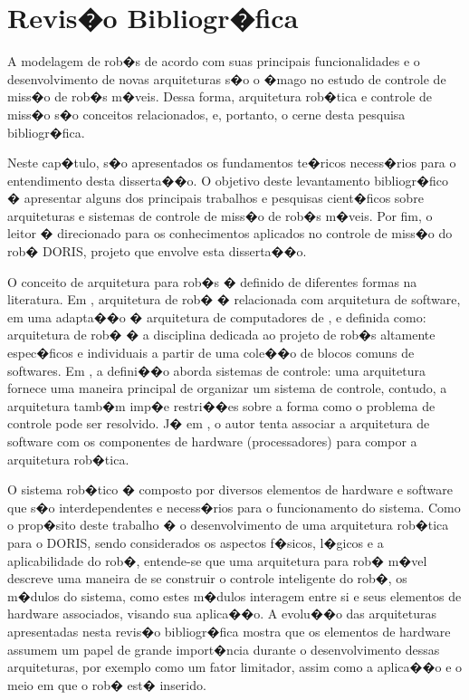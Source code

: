 \chapter{Revis�o Bibliogr�fica}

A modelagem de rob�s de acordo com suas principais funcionalidades e o
desenvolvimento de novas arquiteturas s�o o �mago no estudo de
controle de miss�o de rob�s m�veis. Dessa forma, arquitetura rob�tica e controle
de miss�o s�o conceitos relacionados, e, portanto, o cerne desta pesquisa
bibliogr�fica. 

Neste cap�tulo, s�o apresentados os fundamentos te�ricos necess�rios para o
entendimento desta disserta��o. O objetivo deste levantamento bibliogr�fico �
apresentar alguns dos principais trabalhos e pesquisas cient�ficos sobre
arquiteturas e sistemas de controle de miss�o de rob�s m�veis. Por fim,
o leitor � direcionado para os conhecimentos aplicados no controle de miss�o do
rob� DORIS, projeto que envolve esta disserta��o.

O conceito de arquitetura %
 para rob�s � definido de diferentes formas na
literatura. Em \cite{arkin1998behavior}, arquitetura de rob� �
relacionada com arquitetura de software, em uma adapta��o �
arquitetura de computadores de \cite{stone1980introduction}, e definida como:
arquitetura de rob� � a disciplina dedicada ao projeto de rob�s altamente espec�ficos e individuais
a partir de uma cole��o de blocos comuns de softwares.
Em \cite{mataric1992behavior}, a defini��o aborda sistemas de controle: uma
arquitetura fornece uma maneira principal de organizar um
sistema de controle, contudo, a arquitetura tamb�m imp�e restri��es sobre a
forma como o problema de controle pode ser resolvido. J�
em \cite{brooks1986robust}, o autor tenta associar a arquitetura de software
com os componentes de hardware (processadores) para compor a arquitetura
rob�tica.

O sistema rob�tico � composto por diversos elementos de hardware e
software que s�o interdependentes e necess�rios para o funcionamento do sistema.
Como o prop�sito deste trabalho � o desenvolvimento de uma arquitetura rob�tica
para o DORIS, sendo considerados os aspectos f�sicos, l�gicos e a aplicabilidade do
rob�, entende-se que uma arquitetura para rob� m�vel descreve uma maneira de se construir o
controle inteligente do rob�, os m�dulos do sistema, como estes
m�dulos interagem entre si e seus elementos de hardware associados, visando sua
aplica��o. A evolu��o das arquiteturas apresentadas nesta revis�o
bibliogr�fica mostra que os elementos de hardware assumem um papel de grande
import�ncia durante o desenvolvimento dessas arquiteturas, por exemplo como um
fator limitador, assim como a aplica��o e o meio em que o rob� est� inserido.

